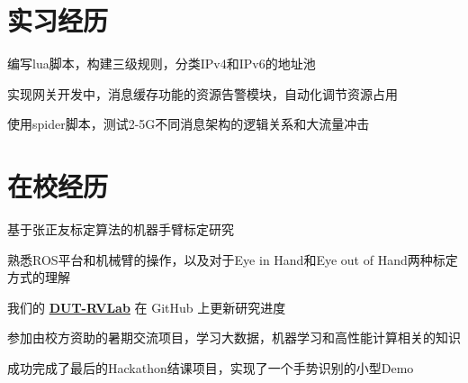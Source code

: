 \documentclass[]{deedy-resume-openfont}
\begin{document}
\begin{minipage}[t]{0.73\textwidth} 


\section{实习经历}
\sectionsep
{}
\vspace{\topsep}
\begin{tightemize}
    \item 编写lua脚本，构建三级规则，分类IPv4和IPv6的地址池
    \item 实现网关开发中，消息缓存功能的资源告警模块，自动化调节资源占用
    \item 使用spider脚本，测试2-5G不同消息架构的逻辑关系和大流量冲击
\end{tightemize}
\sectionsep


\section{在校经历}
\sectionsep
{}
\begin{tightemize}
    \item 基于张正友标定算法的机器手臂标定研究
    \item 熟悉ROS平台和机械臂的操作，以及对于Eye in Hand和Eye out of Hand两种标定方式的理解
    \item 我们的 \href{https://github.com/DUT-RVLab}{\bf DUT-RVLab} 在 GitHub 上更新研究进度
\end{tightemize}
\sectionsep

\begin{tightemize}
    \item 参加由校方资助的暑期交流项目，学习大数据，机器学习和高性能计算相关的知识
    \item 成功完成了最后的Hackathon结课项目，实现了一个手势识别的小型Demo
    \end{tightemize}
\sectionsep



\end{minipage}
\end{document}
